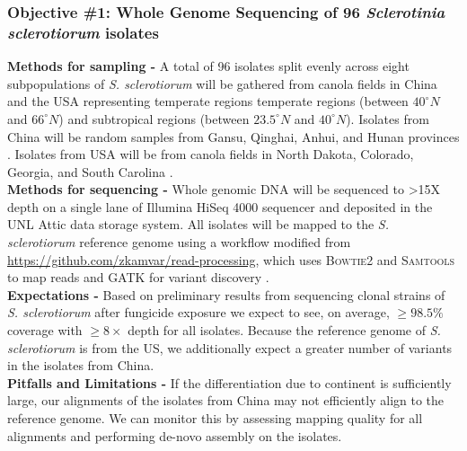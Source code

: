 \documentclass[12pt,letterpaper]{article}
\begin{document}
 
 



\subsubsection{Objective \#1: Whole Genome Sequencing of 96 \textit{Sclerotinia sclerotiorum} isolates}

\noindent \textbf{Methods for sampling -}
A total of 96 isolates split evenly across eight subpopulations of \textit{S. sclerotiorum} will be gathered from canola fields in China and the USA representing temperate regions temperate regions (between $40^{\circ}N$ and $66^{\circ}N$) and subtropical regions (between $23.5^{\circ}N$ and $40^{\circ}N$).
Isolates from China will be random samples from Gansu, Qinghai, Anhui, and Hunan provinces \citep{zhou2014dimethachlon, attanayake2013sclerotinia}.
Isolates from USA will be from canola fields in North Dakota, Colorado, Georgia, and South Carolina \citep{aldrich-wolfe2015genetic,phillips2002phylogeography}.\\
\noindent \textbf{Methods for sequencing -} 
Whole genomic DNA will be sequenced to >15X depth on a single lane of Illumina HiSeq 4000 sequencer and deposited in the UNL Attic data storage system. 
All isolates will be mapped to the \textit{S. sclerotiorum} reference genome using a workflow modified from \url{https://github.com/zkamvar/read-processing}, which uses \textsc{Bowtie2} and \textsc{Samtools} to map reads and \textsc{GATK} for variant discovery \citep{langmead2012fast, li2009sequence, mckenna2010genome, derbyshire2017complete}.\\ 
\noindent \textbf{Expectations -}
Based on preliminary results from sequencing clonal strains of \textit{S. sclerotiorum} after fungicide exposure we expect to see, on average, $\geq98.5\%$ coverage with $\geq8\times$ depth for all isolates. Because the reference genome of \textit{S. sclerotiorum} is from the US, we additionally expect a greater number of variants in the isolates from China.\\
\noindent \textbf{Pitfalls and Limitations -}
If the differentiation due to continent is sufficiently large, our alignments of the isolates from China may not efficiently align to the reference genome. 
We can monitor this by assessing mapping quality for all alignments and performing de-novo assembly on the isolates.
\end{document}
